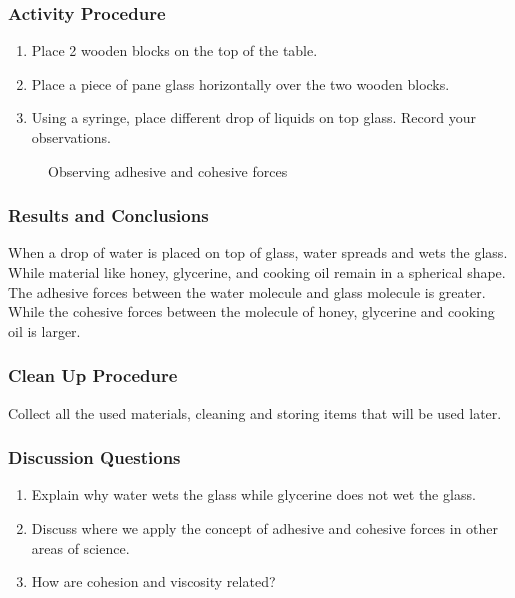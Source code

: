 \subsubsection*{Activity Procedure}
\begin{enumerate}
\item{Place 2 wooden blocks on the top of the table.}
\item{Place a piece of pane glass horizontally over the two wooden blocks.}
\item{Using a syringe, place different drop of liquids on top glass. Record your observations.}
\end{enumerate}

\begin{figure}[h]
\begin{center}
\def\svgwidth{200pt}

\caption{Observing adhesive and cohesive forces}
\label{fig:adhesion-cohesion}
\end{center}
\end{figure}

\subsubsection*{Results and Conclusions}
When a drop of water is placed on top of glass, water spreads and wets the glass. While material like honey, glycerine, and cooking oil remain in a spherical shape. The adhesive forces between the water molecule and glass molecule is greater. While the cohesive forces between the molecule of honey, glycerine and cooking oil is larger.

\subsubsection*{Clean Up Procedure}
Collect all the used materials, cleaning and storing items that will be used later.

\subsubsection*{Discussion Questions}
\begin{enumerate}
\item{Explain why water wets the glass while glycerine does not wet the glass.}
\item{Discuss where we apply the concept of adhesive and cohesive forces in other areas of science.}
\item{How are cohesion and viscosity related?}
\end{enumerate}

